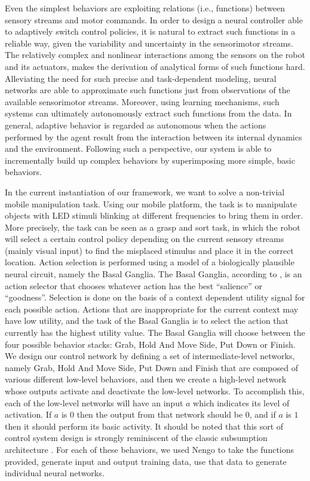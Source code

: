 Even the simplest behaviors are exploiting relations (i.e., functions) between sensory streams and motor commands. 
In order to design a neural controller able to adaptively switch control policies, it is natural to extract such functions in a reliable way, given the variability and uncertainty in the sensorimotor streams. 
The relatively complex and nonlinear interactions among the sensors on the robot and its actuators, makes the derivation of analytical forms of such functions hard. 
Alleviating the need for such precise and task-dependent modeling, neural networks are able to approximate such functions just from observations of the available sensorimotor streams. 
Moreover, using learning mechanisms, such systems can ultimately autonomously extract such functions from the data. 
In general, adaptive behavior is regarded as autonomous when the actions performed by the agent result from the interaction between its internal dynamics and the environment. 
Following such a perspective, our system is able to incrementally build up complex behaviors by superimposing more simple, basic behaviors.

In the current instantiation of our framework, we want to solve a non-trivial mobile manipulation task. 
Using our mobile platform, the task is to manipulate objects with LED stimuli blinking at different frequencies to bring them in order. 
More precisely, the task can be seen as a grasp and sort task, in which the robot will select a certain control policy depending on the current sensory streams (mainly visual input) to find the misplaced stimulus and place it in the correct location. 
Action selection is performed using a model of a biologically plausible neural circuit, namely the Basal Ganglia. 
The Basal Ganglia, according to \textcite{Stewart2010}, is an action selector that chooses whatever action has the best \enquote{salience} or \enquote{goodness}. 
Selection is done on the basis of a context dependent utility signal for each possible action. 
Actions that are inappropriate for the current context may have low utility, and the task of the Basal Ganglia is to select the action that currently has the highest utility value.
The Basal Ganglia will choose between the four possible behavior stacks: Grab, Hold And Move Side, Put Down or Finish.
We design our control network by defining a set of intermediate-level networks, namely Grab, Hold And Move Side, Put Down and Finish that are composed of various different low-level behaviors, and then we create a high-level network whose outputs activate and deactivate the low-level networks. 
To accomplish this, each of the low-level networks will have an input $a$ which indicates its level of activation. 
If $a$ is $0$ then the output from that network should be $0$, and if $a$ is $1$ then it should perform its basic activity. 
It should be noted that this sort of control system design is strongly reminiscent of the classic subsumption architecture \parencite{Brooks1986}.
For each of these behaviors, we used \ac{Nengo} to take the functions provided, generate input and output training data, use that data to generate individual neural networks.

